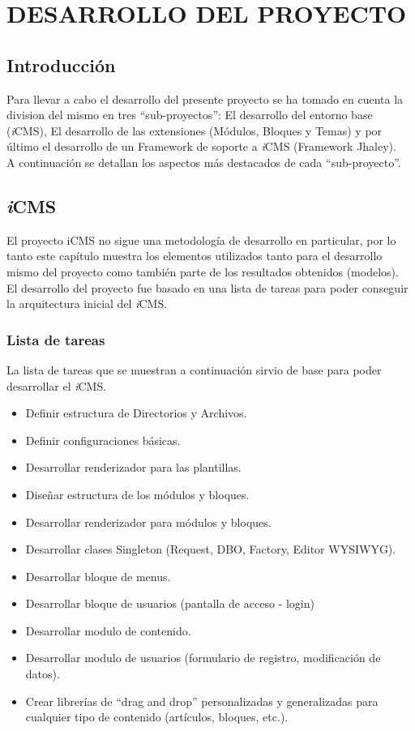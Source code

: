 \chapter{DESARROLLO DEL PROYECTO}
\newpage
\section{Introducci\'on}
Para llevar a cabo el desarrollo del presente proyecto se ha tomado en cuenta la division del mismo en tres ``sub-proyectos'': El desarrollo del entorno base (\textit{i}CMS), El desarrollo de las extensiones (M\'odulos, Bloques y Temas) y por \'ultimo el desarrollo de un Framework de soporte a \textit{i}CMS (Framework Jhaley).\\

A continuaci\'on se detallan los aspectos m\'as destacados de cada ``sub-proyecto''.

\section{\textit{i}CMS}
El proyecto iCMS no sigue una metodolog\'ia de desarrollo en particular, por lo tanto este cap\'itulo muestra los elementos utilizados tanto para el desarrollo mismo del proyecto como tambi\'en parte de los resultados obtenidos (modelos).\\

El desarrollo del proyecto fue basado en una lista de tareas para poder conseguir la arquitectura inicial del \textit{i}CMS.\\

\subsection{Lista de tareas}
La lista de tareas que se muestran a continuaci\'on sirvio de base para poder desarrollar el \textit{i}CMS.

\begin{itemize}
\item Definir estructura de Directorios y Archivos.
\item Definir configuraciones b\'asicas.
\item Desarrollar renderizador para las plantillas.
\item Dise\~nar estructura de los m\'odulos y bloques.
\item Desarrollar renderizador para m\'odulos y bloques.
\item Desarrollar clases Singleton (Request, DBO, Factory, Editor WYSIWYG).
\item Desarrollar bloque de menus.
\item Desarrollar bloque de usuarios (pantalla de acceso - login)
\item Desarrollar modulo de contenido.
\item Desarrollar modulo de usuarios (formulario de registro, modificación de datos).
\item Crear librerías de “drag and drop” personalizadas y generalizadas para cualquier tipo de contenido (artículos, bloques, etc.).
\end{itemize}

